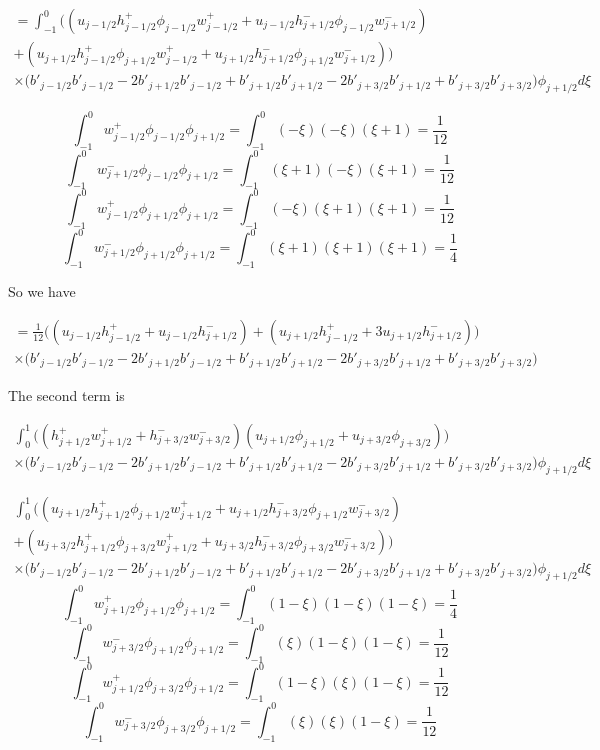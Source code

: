 \documentclass[12pt]{article}
\begin{document}
\begin{multline*}
=\int_{-1}^{0} \bigg(\left(u_{j-1/2}h^+_{j-1/2} \phi_{j-1/2} w^+_{j-1/2} + u_{j-1/2}h^-_{j+1/2} \phi_{j-1/2} w^-_{j+1/2} \right) \\+ \left(u_{j+1/2}h^+_{j-1/2} \phi_{j+1/2} w^+_{j-1/2} + u_{j+1/2}h^-_{j+1/2} \phi_{j+1/2} w^-_{j+1/2} \right)\bigg)\\\times \big(b'_{j-1/2}b'_{j-1/2} - 2b'_{j+1/2}b'_{j-1/2}+ b'_{j+1/2}b'_{j+1/2}  - 2b'_{j+3/2}b'_{j+1/2}  +  b'_{j+3/2}b'_{j+3/2} \big)\phi_{j +1/2} d \xi
\end{multline*}


\[\int_{-1}^{0} w^+_{j-1/2}\phi_{j-1/2} \phi_{j+1/2} = \int_{-1}^{0} (-\xi)(-\xi)(\xi+1) = \frac{1}{12}\]
\[\int_{-1}^{0} w^-_{j+1/2}\phi_{j-1/2} \phi_{j+1/2} = \int_{-1}^{0} (\xi+ 1)(-\xi)(\xi+1)  = \frac{1}{12} \]
\[\int_{-1}^{0} w^+_{j-1/2}\phi_{j+1/2} \phi_{j+1/2} = \int_{-1}^{0} (-\xi)(\xi+1)(\xi+1)  = \frac{1}{12}\]
\[\int_{-1}^{0} w^-_{j+1/2}\phi_{j+1/2} \phi_{j+1/2} = \int_{-1}^{0} (\xi+1)(\xi+1)(\xi+1) = \frac{1}{4}\]

So we have

\begin{multline*}
= \frac{1}{12}\bigg(\left(u_{j-1/2}h^+_{j-1/2} + u_{j-1/2}h^-_{j+1/2} \right) + \left(u_{j+1/2}h^+_{j-1/2} + 3u_{j+1/2}h^-_{j+1/2}\right)\bigg)\\\times \big(b'_{j-1/2}b'_{j-1/2} - 2b'_{j+1/2}b'_{j-1/2}+ b'_{j+1/2}b'_{j+1/2}  - 2b'_{j+3/2}b'_{j+1/2}  +  b'_{j+3/2}b'_{j+3/2} \big)
\end{multline*}

The second term is

\begin{multline*}
\int_{0}^{1} \bigg(\left( h^+_{j+1/2} w^+_{j+1/2} + h^-_{j+3/2} w^-_{j+3/2}\right)\left(u_{j+1/2} \phi_{j+1/2} + u_{j+3/2} \phi_{j+3/2} \right) \bigg)\\\times \big(b'_{j-1/2}b'_{j-1/2} -  2b'_{j+1/2}b'_{j-1/2} + b'_{j+1/2}b'_{j+1/2} - 2b'_{j+3/2}b'_{j+1/2}  +  b'_{j+3/2}b'_{j+3/2} \big)\phi_{j +1/2} d \xi
\end{multline*}

\begin{multline*}
\int_{0}^{1} \bigg(\left( u_{j+1/2} h^+_{j+1/2} \phi_{j+1/2}w^+_{j+1/2} + u_{j+1/2} h^-_{j+3/2} \phi_{j+1/2}w^-_{j+3/2}\right) \\+ \left( u_{j+3/2} h^+_{j+1/2} \phi_{j+3/2}w^+_{j+1/2} + u_{j+3/2}h^-_{j+3/2} \phi_{j+3/2}w^-_{j+3/2}\right)\bigg)\\\times \big(b'_{j-1/2}b'_{j-1/2} -  2b'_{j+1/2}b'_{j-1/2} + b'_{j+1/2}b'_{j+1/2} - 2b'_{j+3/2}b'_{j+1/2}  +  b'_{j+3/2}b'_{j+3/2} \big)\phi_{j +1/2} d \xi
\end{multline*}
\[\int_{-1}^{0} w^+_{j+1/2}\phi_{j+1/2} \phi_{j+1/2} = \int_{-1}^{0} (1-\xi)(1-\xi)(1-\xi) = \frac{1}{4}\]
\[\int_{-1}^{0} w^-_{j+3/2}\phi_{j+1/2} \phi_{j+1/2} = \int_{-1}^{0} (\xi)(1-\xi)(1-\xi)  = \frac{1}{12} \]
\[\int_{-1}^{0} w^+_{j+1/2}\phi_{j+3/2} \phi_{j+1/2} = \int_{-1}^{0} (1-\xi)(\xi)(1-\xi)  = \frac{1}{12}\]
\[\int_{-1}^{0} w^-_{j+3/2}\phi_{j+3/2} \phi_{j+1/2} = \int_{-1}^{0} (\xi)(\xi)(1-\xi) = \frac{1}{12}\]
\end{document}
